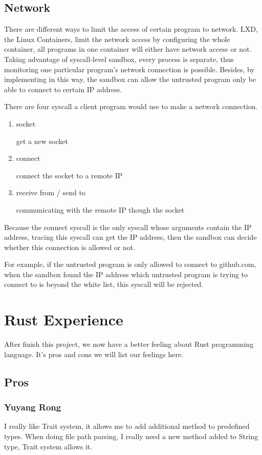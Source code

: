\documentclass[conference,compsoc]{IEEEtran}
\begin{document}
		\subsection{Network}
		\par
		There are different ways to limit the access of certain program to network. LXD, the Linux Containers, limit the network access by configuring the whole container, all programs in one container will either have network access or not. Taking advantage of syscall-level sandbox,  every process is separate, thus monitoring one particular  program's network connection is possible. Besides, by implementing in this way, the sandbox can allow the untrusted program only be able to connect to certain IP address.
		\par
		There are four syscall a client program would use to make a network connection. 
		\begin{enumerate}
		\item socket
			\par
			get a new socket
		\item connect
			\par
			connect the socket to a remote IP
		\item receive from / send to
			\par
			communicating with the remote IP though the socket
		\end{enumerate}
		\par 
		Because the connect syscall is the only syscall whose arguments contain the IP address, tracing this syscall can get the IP address, then the sandbox can decide whether this connection is allowed or not. 
		\par
		For example, if the untrusted program is only allowed to connect to github.com, when the sandbox found the IP address which untrusted program is trying to connect to is beyond the white list, this syscall will be rejected.
		


\section{Rust Experience}
	After finish this project, we now have a better feeling about Rust programming language. It's pros and cons we will list our feelings here.
	\subsection{Pros}
		\subsubsection{Yuyang Rong}
			\par
				I really like Trait system, it allows me to add additional method to predefined types. 
				When doing file path parsing, I really need a new method added to String type, Trait system allows it.
\end{document}
